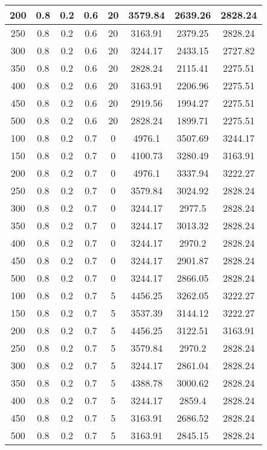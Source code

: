 \documentclass[a4paper, 12pt]{extreport}
\begin{document}
\begin{itemize}
\begin{longtable}{|c|c|c|c|c|c|c|c|}
			200 & 0.8 & 0.2 & 0.6 & 20 & 3579.84 & 2639.26 & 2828.24 \\\hline
			250 & 0.8 & 0.2 & 0.6 & 20 & 3163.91 & 2379.25 & 2828.24 \\\hline
			300 & 0.8 & 0.2 & 0.6 & 20 & 3244.17 & 2433.15 & 2727.82 \\\hline
			350 & 0.8 & 0.2 & 0.6 & 20 & 2828.24 & 2115.41 & 2275.51 \\\hline
			400 & 0.8 & 0.2 & 0.6 & 20 & 3163.91 & 2206.96 & 2275.51 \\\hline
			450 & 0.8 & 0.2 & 0.6 & 20 & 2919.56 & 1994.27 & 2275.51 \\\hline
			500 & 0.8 & 0.2 & 0.6 & 20 & 2828.24 & 1899.71 & 2275.51 \\\hline
			100 & 0.8 & 0.2 & 0.7 & 0 & 4976.1 & 3507.69 & 3244.17 \\\hline
			150 & 0.8 & 0.2 & 0.7 & 0 & 4100.73 & 3280.49 & 3163.91 \\\hline
			200 & 0.8 & 0.2 & 0.7 & 0 & 4976.1 & 3337.94 & 3222.27 \\\hline
			250 & 0.8 & 0.2 & 0.7 & 0 & 3579.84 & 3024.92 & 2828.24 \\\hline
			300 & 0.8 & 0.2 & 0.7 & 0 & 3244.17 & 2977.5 & 2828.24 \\\hline
			350 & 0.8 & 0.2 & 0.7 & 0 & 3244.17 & 3013.32 & 2828.24 \\\hline
			400 & 0.8 & 0.2 & 0.7 & 0 & 3244.17 & 2970.2 & 2828.24 \\\hline
			450 & 0.8 & 0.2 & 0.7 & 0 & 3244.17 & 2901.87 & 2828.24 \\\hline
			500 & 0.8 & 0.2 & 0.7 & 0 & 3244.17 & 2866.05 & 2828.24 \\\hline
			100 & 0.8 & 0.2 & 0.7 & 5 & 4456.25 & 3262.05 & 3222.27 \\\hline
			150 & 0.8 & 0.2 & 0.7 & 5 & 3537.39 & 3144.12 & 3222.27 \\\hline
			200 & 0.8 & 0.2 & 0.7 & 5 & 4456.25 & 3122.51 & 3163.91 \\\hline
			250 & 0.8 & 0.2 & 0.7 & 5 & 3579.84 & 2970.2 & 2828.24 \\\hline
			300 & 0.8 & 0.2 & 0.7 & 5 & 3244.17 & 2861.04 & 2828.24 \\\hline
			350 & 0.8 & 0.2 & 0.7 & 5 & 4388.78 & 3000.62 & 2828.24 \\\hline
			400 & 0.8 & 0.2 & 0.7 & 5 & 3244.17 & 2859.4 & 2828.24 \\\hline
			450 & 0.8 & 0.2 & 0.7 & 5 & 3163.91 & 2686.52 & 2828.24 \\\hline
			500 & 0.8 & 0.2 & 0.7 & 5 & 3163.91 & 2845.15 & 2828.24 \\\hline

\end{longtable}
\end{itemize}
\end{document}
